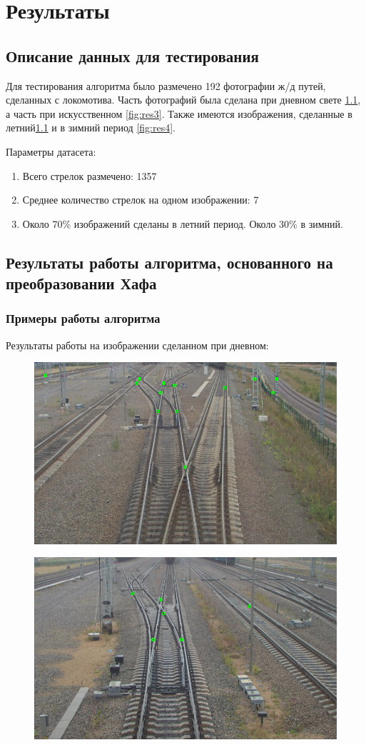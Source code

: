 \chapter{Результаты}

\section{Описание данных для тестирования}
Для тестирования алгоритма было размечено 192 фотографии ж/д путей, сделанных с локомотива. Часть фотографий была сделана при дневном свете \ref{fig:res1}, а часть при искусственном \ref{fig:res3}. Также имеются изображения, сделанные в летний\ref{fig:res1} и в зимний период \ref{fig:res4}.

Параметры датасета:
\begin{enumerate}
	\item Всего стрелок размечено: 1357
	\item Среднее количество стрелок на одном изображении: 7
	\item Около 70\% изображений сделаны в летний период. Около 30\% в зимний.
\end{enumerate}

\section{Результаты работы алгоритма, основанного на преобразовании Хафа}
\subsection{Примеры работы алгоритма}
Результаты работы на изображении сделанном при дневном:
\begin{figure}[!h]
	\centering
	\includegraphics[width=0.7\linewidth]{pictures/screenshot0015}
	\caption{}
	\label{fig:res1}
\end{figure}
\begin{figure}[!h]
	\centering
	\includegraphics[width=0.7\linewidth]{pictures/screenshot0016}
	\caption{}
	\label{fig:res2}
\end{figure}
\newpage

